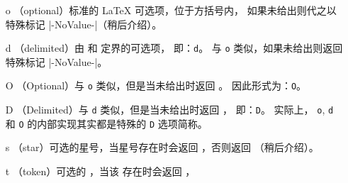 \documentclass{l3doc}
\begin{document}
\begin{itemize}[font=\ttfamily]
    \item[o] （optional）标准的 \LaTeX{} 可选项，位于方括号内，
    如果未给出则代之以特殊标记 |-NoValue-|（稍后介绍）。
    \item[d] （delimited）由  和  定界的可选项，
    即：\texttt{d}。
    与 \texttt{o} 类似，如果未给出则返回特殊标记 |-NoValue-|。
    \item[O] （Optional）与 \texttt{o} 类似，但是当未给出时返回 。
    因此形式为：\texttt{O}。
    \item[D] （Delimited）与 \texttt{d} 类似，但是当未给出时返回 ，
    即：\texttt{D}。
    实际上， \texttt{o}, \texttt{d} 和 \texttt{O} 的内部实现其实都是特殊的 \texttt{D} 选项简称。
    \item[s] （star）可选的星号，当星号存在时会返回 ，否则返回 （稍后介绍）。
    \item[t] （token）可选的 ，当该  存在时会返回 ，

\end{itemize}
\end{document}
